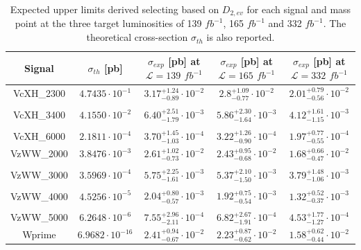 \begin{table}[htbp]
\centering
\begin{tabular}{|c|c||c|c|c|}
\hline
\rowcolor{lightgray}
\textbf{Signal} &  \textbf{$\sigma_{th}$ [pb]} & \shortstack{\textbf{$\sigma_{exp}$ [pb]}\\\textbf{at $\mathcal{L}=139$ $fb^{-1}$}} & \shortstack{\textbf{$\sigma_{exp}$ [pb]}\\\textbf{at $\mathcal{L}=165$ $fb^{-1}$}} & \shortstack{\textbf{$\sigma_{exp}$ [pb]}\\\textbf{at $\mathcal{L}=332$ $fb^{-1}$}}\\
\hline\hline 

VcXH\_2300 &  $4.7435 \cdot 10^{-1}$ & $3.17^{+1.24}_{-0.89} \cdot 10^{-2}$ & $2.8^{+1.09}_{-0.77} \cdot 10^{-2}$ & $2.01^{+0.79}_{-0.56} \cdot 10^{-2}$ \\
 &&&&\\ 
VcXH\_3400 &  $4.1550 \cdot 10^{-2}$ & $6.40^{+2.51}_{-1.79} \cdot 10^{-3}$ & $5.86^{+2.30}_{-1.64} \cdot 10^{-3}$ & $4.12^{+1.61}_{-1.15} \cdot 10^{-3}$ \\
 &&&&\\ 
VcXH\_6000 &  $2.1811 \cdot 10^{-4}$ & $3.70^{+1.45}_{-1.03} \cdot 10^{-4}$ & $3.22^{+1.26}_{-0.90} \cdot 10^{-4}$ & $1.97^{+0.77}_{-0.55} \cdot 10^{-4}$ \\
\hline

 VzWW\_2000 & $3.8476 \cdot 10^{-3}$ & $2.61^{+1.02}_{-0.73} \cdot 10^{-2}$ & $2.43^{+0.95}_{-0.68} \cdot 10^{-2}$ & $1.68^{+0.66}_{-0.47} \cdot 10^{-2}$ \\
  &&&&\\
 VzWW\_3000 & $3.5969 \cdot 10^{-4}$ & $5.75^{+2.25}_{-1.61} \cdot 10^{-3}$ & $5.37^{+2.10}_{-1.50} \cdot 10^{-3}$ & $3.79^{+1.48}_{-1.06} \cdot 10^{-3}$ \\
  &&&&\\
 VzWW\_4000 & $4.5256 \cdot 10^{-5}$ & $2.04^{+0.80}_{-0.57} \cdot 10^{-3}$ & $1.92^{+0.75}_{-0.54} \cdot 10^{-3}$ & $1.32^{+0.52}_{-0.37} \cdot 10^{-3}$ \\
  &&&&\\
 VzWW\_5000 & $6.2648 \cdot 10^{-6}$ & $7.55^{+2.96}_{-2.11} \cdot 10^{-4}$ & $6.82^{+2.67}_{-1.91} \cdot 10^{-4}$ & $4.53^{+1.77}_{-1.27} \cdot 10^{-4}$ \\
\hline
 
 Wprime  & $6.9682 \cdot 10^{-16}$  & $2.41^{+0.94}_{-0.67} \cdot 10^{-2}$ & $2.23^{+0.87}_{-0.62} \cdot 10^{-2}$ & $1.58^{+0.62}_{-0.44} \cdot 10^{-2}$ \\
\hline
 

\end{tabular}
\caption{Expected upper limits derived selecting based on $D_{2,ev}$ for each signal and mass point at the three target luminosities of 139 $fb^{-1}$, 165 $fb^{-1}$ and 332 $fb^{-1}$. The theoretical cross-section $\sigma_{th}$ is also reported.}
\label{tab:ADJJ/D2/SigmaLimits}
\end{table}



